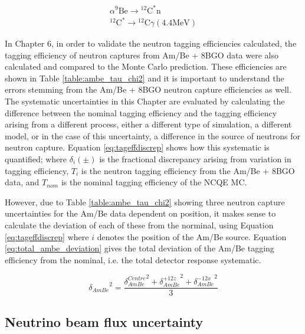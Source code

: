 \begin{equation}
    \begin{gathered}
    \alpha{ }^9 \mathrm{Be} \longrightarrow{ }^{12} \mathrm{C}^* \mathrm{n} \\
    { }^{12} \mathrm{C}^* \longrightarrow{ }^{12} \mathrm{C} \gamma(4.4 \mathrm{MeV})
    \end{gathered}
\label{eq:ambe_decay_2}
\end{equation}

In Chapter 6, in order to validate the neutron tagging efficiencies calculated, the tagging efficiency of neutron captures from Am/Be + 8BGO data were also calculated and compared to the Monte Carlo prediction. These efficiencies are shown in Table \ref{table:ambe_tau_chi2} and it is important to understand the errors stemming from the Am/Be + 8BGO neutron capture efficiencies as well. The systematic uncertainties in this Chapter are evaluated by calculating the difference between the nominal tagging efficiency and the tagging efficiency arising from a different process, either a different type of simulation, a different model, or in the case of this uncertainty, a difference in the source of neutrons for neutron capture. Equation \ref{eq:tageffdiscrep} shows how this systematic is quantified; where $\delta_{i}(\pm)$ is the fractional discrepancy arising from variation in tagging efficiency, $T_{i}$ is the neutron tagging efficiency from the Am/Be + 8BGO data, and $T_{nom}$ is the nominal tagging efficiency of the NCQE MC. 

However, due to Table \ref{table:ambe_tau_chi2} showing three neutron capture uncertainties for the Am/Be data dependent on position, it makes sense to calculate the deviation of each of these from the norminal, using Equation \ref{eq:tageffdiscrep} where $i$ denotes the position of the Am/Be source. Equation \ref{eq:total_ambe_deviation} gives the total deviation of the Am/Be tagging efficiency from the nominal, i.e. the total detector response systematic.

\begin{equation}
    {\delta_{AmBe}}^2= \frac{{\delta_{AmBe}^{Centre}}^2 + {\delta_{AmBe}^{+12z}}^2 + {\delta_{AmBe}^{-12x}}^2}{3} 
\label{eq:total_ambe_deviation}
\end{equation}




\subsection{Neutrino beam flux uncertainty}

